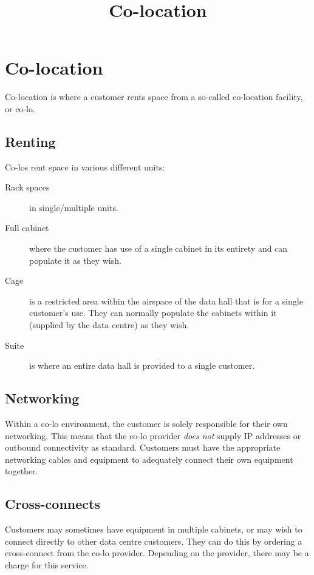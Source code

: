 \documentclass{pgnotes}
\title{Co-location}
\begin{document}
\maketitle

\section{Co-location}

Co-location is where a customer rents space from a so-called co-location facility, or co-lo.

\subsection{Renting}

Co-los rent space in various different units:
\begin{description}
\item[Rack spaces] in single/multiple units.
\item[Full cabinet] where the customer has use of a single cabinet in its entirety and can populate it as they wish.
\item[Cage] is a restricted area within the airspace of the data hall that is for a single customer's use.  They can normally populate the cabinets within it (supplied by the data centre) as they wish. 
\item[Suite] is where an entire data hall is provided to a single customer.
\end{description}

\subsection{Networking}

Within a co-lo environment, the customer is solely responsible for their own networking.
This means that the co-lo provider \textit{does not} supply IP addresses or outbound connectivity as standard.
Customers must have the appropriate networking cables and equipment to adequately connect their own equipment together.

\subsection{Cross-connects}

Customers may sometimes have equipment in multiple cabinets, or may wish to connect directly to other data centre customers.
They can do this by ordering a cross-connect from the co-lo provider.
Depending on the provider, there may be a charge for this service.
\end{document}
